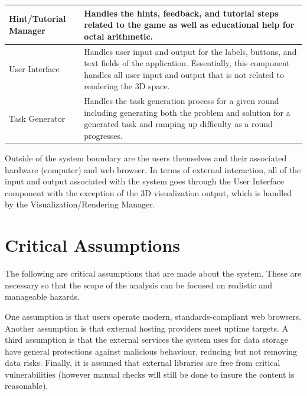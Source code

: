 \documentclass{article}
\begin{document}
\begin{tabularx}{\linewidth}{|Y|Y|}
    \hline

    Hint/Tutorial Manager &
    Handles the hints, feedback, and tutorial steps related to the game as well as educational help for octal arithmetic. \\

    \hline

    User Interface &
    Handles user input and output for the labels, buttons, and text fields of the application. Essentially, this component handles all user input and output that is not related to rendering the 3D space. \\

    \hline

    Task Generator &
    Handles the task generation process for a given round including generating both the problem and solution for a generated task and ramping up difficulty as a round progresses. \\

\end{tabularx}

Outside of the system boundary are the users themselves and their associated hardware (computer) and web browser. In terms of external interaction, all of the input and output associated with the system goes through the User Interface component with the exception of the 3D visualization output, which is handled by the Visualization/Rendering Manager.

\section{Critical Assumptions}

The following are critical assumptions that are made about the system. These are necessary so that the scope of the analysis can be focused on realistic and manageable hazards.

One assumption is that users operate modern, standards-compliant web browsers. Another assumption is that external hosting providers meet uptime targets. A third assumption is that the external services the system uses for data storage have general protections against malicious behaviour, reducing but not removing data risks. Finally, it is assumed that external libraries are free from critical vulnerabilities (however manual checks will still be done to insure the content is reasonable).
\end{document}
